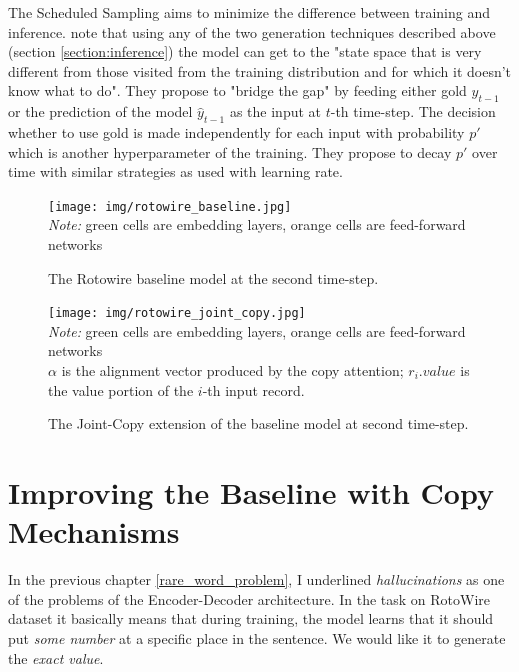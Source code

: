 The Scheduled Sampling aims to minimize the difference between training and inference. \citep{bengio2015scheduled} note that using any of the two generation techniques described above (section \ref{section:inference}) the model can get to the "state space that is very different from those visited from the  training distribution and for which it doesn’t know what to do". They propose to "bridge the gap" by feeding either gold $y_{t-1}$ or the prediction of the model $\hat{y}_{t-1}$ as the input at $t$-th time-step. The decision whether to use gold is made independently for each input with probability $p'$ which is another hyperparameter of the training. They propose to decay $p'$ over time with similar strategies as used with learning rate.

\begin{figure}[!h]
    \centering
    \texttt{[image: img/rotowire\_baseline.jpg]}
    \footnotesize{\\ \textit{Note:} green cells are embedding layers, orange cells are feed-forward networks}
    \caption{\centering The Rotowire baseline model at the second time-step.} \label{rotowire_baseline_vis}
\end{figure}

\begin{figure}[!h]
    \centering
    \texttt{[image: img/rotowire\_joint\_copy.jpg]}
    \footnotesize{\\ \textit{Note:} green cells are embedding layers, orange cells are feed-forward networks \\ $\alpha$ is the alignment vector produced by the copy attention; $r_i.value$ is the value portion of the $i$-th input record.}
    \caption{\centering The Joint-Copy extension of the baseline model at second time-step.} \label{rotowire_joint_copy_vis}
\end{figure}

\section{Improving the Baseline with Copy Mechanisms} \label{section:copy_mechanism_intro}

In the previous chapter \ref{rare_word_problem}, I underlined \emph{hallucinations} as one of the problems of the Encoder-Decoder architecture. In the task on RotoWire dataset it basically means that during training, the model learns that it should put \emph{some number} at a specific place in the sentence. We would like it to generate the \emph{exact value}.

